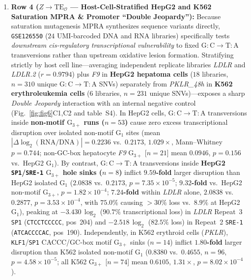 \documentclass[10pt,letterpaper]{article}
\theoremstyle{plain}
\theoremstyle{definition}
\begin{document}
\begin{enumerate}[leftmargin=1.8em,itemsep=2pt]
    \item \textbf{Row 4 ($Z \to \mathrm{TE}_{\mathcal{O}}$ --- Host-Cell-Stratified HepG2 and K562 Saturation MPRA \& Promoter ``Double Jeopardy''):} Because saturation mutagenesis MPRA synthesizes sequence variants directly, \texttt{GSE126550} ($24$ UMI-barcoded DNA and RNA libraries) \cite{kircher2019natcommun} specifically tests \emph{downstream cis-regulatory transcriptional vulnerability} to fixed $\mathrm{G{:}C \to T{:}A}$ transversions rather than upstream oxidative lesion formation. Stratifying strictly by host cell line---averaging independent replicate libraries \emph{LDLR} and \emph{LDLR.2} ($r = 0.9794$) plus \emph{F9} in \textbf{HepG2 hepatoma cells} ($18$ libraries, $n = 310$ unique $\mathrm{G{:}C \to T{:}A}$ SNVs) separately from \emph{PKLR\_48h} in \textbf{K562 erythroleukemia cells} ($6$ libraries, $n = 231$ unique SNVs)---exposes a sharp \emph{Double Jeopardy} interaction with an internal negative control (Fig.~\ref{fig:fig6}C1,C2 and table~S4). In HepG2 cells, $\mathrm{G{:}C \to T{:}A}$ transversions inside \textbf{non-motif $\mathrm{G}_{3+}$ runs ($n = 53$)} cause zero excess transcriptional disruption over isolated non-motif $\mathrm{G}_1$ sites (mean $|\Delta\log_2(\mathrm{RNA/DNA})| = 0.2236$ vs.\ $0.2173$, $1.029\times$, Mann--Whitney $p = 0.744$; non-GC-box hepatocyte \emph{F9} $\mathrm{G}_{3+}$ [$n=21$] mean $0.0946$, $p = 0.156$ vs.\ HepG2 $\mathrm{G}_1$). By contrast, $\mathrm{G{:}C \to T{:}A}$ transversions inside \textbf{HepG2 \texttt{SP1}/\texttt{SRE-1} $\mathrm{G}_{3+}$ hole sinks ($n = 8$)} inflict \textbf{$9.59$-fold} larger disruption than HepG2 isolated $\mathrm{G}_1$ ($2.0838$ vs.\ $0.2173$, $p = 7.35 \times 10^{-5}$; \textbf{$9.32$-fold} vs.\ HepG2 non-motif $\mathrm{G}_{3+}$, $p = 1.82 \times 10^{-4}$; \textbf{$7.24$-fold} within \emph{LDLR} alone, $2.0838$ vs.\ $0.2877$, $p = 3.53 \times 10^{-4}$, with $75.0\%$ causing $>30\%$ loss vs.\ $8.9\%$ at HepG2 $\mathrm{G}_1$), peaking at $-3.430\,\log_2$ ($90.7\%$ transcriptional loss) in \emph{LDLR} Repeat~3 \texttt{SP1} (\texttt{CTCCTCCCCC}, pos~204) and $-2.518\,\log_2$ ($82.5\%$ loss) in Repeat~2 \texttt{SRE-1} (\texttt{ATCACCCCAC}, pos~190). Independently, in K562 erythroid cells (\emph{PKLR}), \texttt{KLF1}/\texttt{SP1} CACCC/GC-box motif $\mathrm{G}_{3+}$ sinks ($n = 14$) inflict \textbf{$1.80$-fold} larger disruption than K562 isolated non-motif $\mathrm{G}_1$ ($0.8380$ vs.\ $0.4655$, $n = 96$, $p = 4.58 \times 10^{-5}$; all K562 $\mathrm{G}_{3+}$ [$n = 74$] mean $0.6105$, $1.31\times$, $p = 8.02 \times 10^{-4}$).

\end{enumerate}
\end{document}
